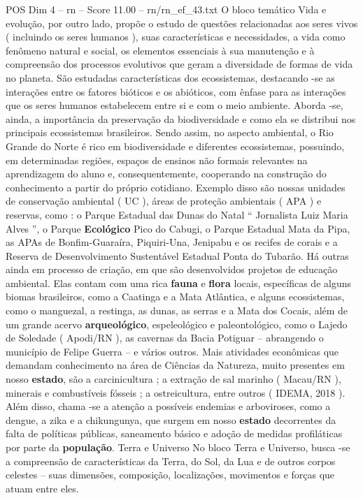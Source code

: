 \begin{textsample}{POS Dim 4 – rn – Score 11.00 – rn/rn\_ef\_43.txt}
O bloco temático Vida e evolução, por outro lado, propõe o estudo de questões relacionadas aos seres vivos ( incluindo os seres humanos ), suas características e necessidades, a vida como fenômeno natural e social, os elementos essenciais à sua manutenção e à compreensão dos processos evolutivos que geram a diversidade de formas de vida no planeta.
São estudadas características dos ecossistemas, destacando -se as interações entre os fatores bióticos e os abióticos, com ênfase para as interações que os seres humanos estabelecem entre si e com o meio ambiente.
Aborda -se, ainda, a importância da preservação da biodiversidade e como ela se distribui nos principais ecossistemas brasileiros.
Sendo assim, no aspecto ambiental, o Rio Grande do Norte é rico em biodiversidade e diferentes ecossistemas, possuindo, em determinadas regiões, espaços de ensinos não formais relevantes na aprendizagem do aluno e, consequentemente, cooperando na construção do conhecimento a partir do próprio cotidiano.
Exemplo disso são nossas unidades de conservação ambiental ( UC ), áreas de proteção ambientais ( APA ) e reservas, como : o Parque Estadual das Dunas do Natal “ Jornalista Luiz Maria Alves ”, o Parque \textbf{Ecológico} Pico do Cabugi, o Parque Estadual Mata da Pipa, as APAs de Bonfim-Guaraíra, Piquiri-Una, Jenipabu e os recifes de corais e a Reserva de Desenvolvimento Sustentável Estadual Ponta do Tubarão.
Há outras ainda em processo de criação, em que são desenvolvidos projetos de educação ambiental.
Elas contam com uma rica \textbf{fauna} e \textbf{flora} locais, específicas de alguns biomas brasileiros, como a Caatinga e a Mata Atlântica, e alguns ecossistemas, como o manguezal, a restinga, as dunas, as serras e a Mata dos Cocais, além de um grande acervo \textbf{arqueológico}, espeleológico e paleontológico, como o Lajedo de Soledade ( Apodi/RN ), as cavernas da Bacia Potiguar – abrangendo o município de Felipe Guerra – e vários outros.
Mais atividades econômicas que demandam conhecimento na área de Ciências da Natureza, muito presentes em nosso \textbf{estado}, são a carcinicultura ; a extração de sal marinho ( Macau/RN ), minerais e combustíveis fósseis ; a ostreicultura, entre outros ( IDEMA, 2018 ).
Além disso, chama -se a atenção a possíveis endemias e arboviroses, como a dengue, a zika e a chikungunya, que surgem em nosso \textbf{estado} decorrentes da falta de políticas públicas, saneamento básico e adoção de medidas profiláticas por parte da \textbf{população}.
Terra e Universo No bloco Terra e Universo, busca -se a compreensão de características da Terra, do Sol, da Lua e de outros corpos celestes – suas dimensões, composição, localizações, movimentos e forças que atuam entre eles.

\end{textsample}
